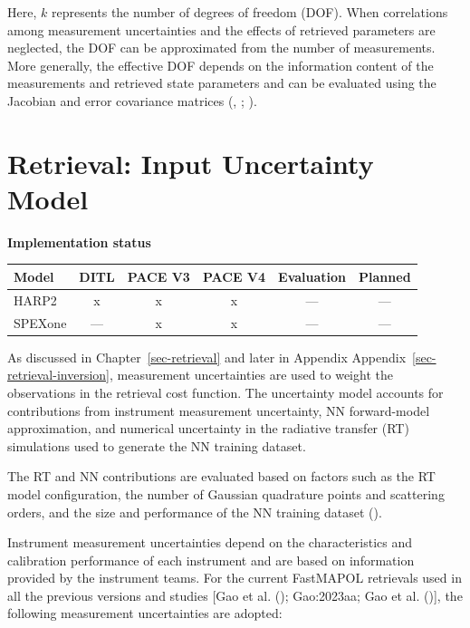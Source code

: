 \documentclass[
  11pt,
  letterpaper,
]{scrreprt}
\begin{document}
Here, \(k\) represents the number of degrees of freedom (DOF). When
correlations among measurement uncertainties and the effects of
retrieved parameters are neglected, the DOF can be approximated from the
number of measurements. More generally, the effective DOF depends on the
information content of the measurements and retrieved state parameters
and can be evaluated using the Jacobian and error covariance matrices
(,
; ).

\chapter{Retrieval: Input Uncertainty
Model}\label{sec-retrieval-unc-model}

\textbf{Implementation status}

\begin{longtable}[]{@{}lccccc@{}}
\toprule\noalign{}
Model & DITL & PACE V3 & PACE V4 & Evaluation & Planned \\
\midrule\noalign{}
\endhead
\bottomrule\noalign{}
\endlastfoot
HARP2 & x & x & x & --- & --- \\
SPEXone & --- & x & x & --- & --- \\
\end{longtable}

As discussed in Chapter~\ref{sec-retrieval} and later in Appendix
Appendix~\ref{sec-retrieval-inversion}, measurement uncertainties are
used to weight the observations in the retrieval cost function. The
uncertainty model accounts for contributions from instrument measurement
uncertainty, NN forward-model approximation, and numerical uncertainty
in the radiative transfer (RT) simulations used to generate the NN
training dataset.

The RT and NN contributions are evaluated based on factors such as the
RT model configuration, the number of Gaussian quadrature points and
scattering orders, and the size and performance of the NN training
dataset ().

Instrument measurement uncertainties depend on the characteristics and
calibration performance of each instrument and are based on information
provided by the instrument teams. For the current FastMAPOL retrievals
used in all the previous versions and studies {[}Gao et al.
(); Gao:2023aa; Gao et al.
(){]}, the following measurement
uncertainties are adopted:
\end{document}
